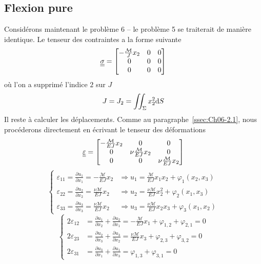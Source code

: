 \subsection{Flexion pure}
Considérons maintenant le problème 6 -- le problème 5 se traiterait de manière identique.
Le tenseur des contraintes a la forme suivante
\begin{equation}
    \underline{\underline{\sigma}} = 
    \begin{bmatrix}
        -\frac{\mathcal{M}}{J}x_2 & 0 & 0 \\
        0 & 0 & 0 \\
        0 & 0 & 0
    \end{bmatrix}
    \label{eq:Ch07-025}
\end{equation}
où l'on a supprimé l'indice $2$ sur $J$
\begin{equation}
    J=J_2 = \iint_{\Sigma} x_2^2 \mathrm{d} S
    \label{eq:Ch07-026}
\end{equation}
Il reste à calculer les déplacements.
Comme au paragraphe~\ref{ssec:Ch06-2.1}, nous procéderons directement en écrivant le tenseur des déformations
\begin{equation}
    \underline{\underline{\varepsilon}} = 
    \begin{bmatrix}
        -\frac{\mathcal{M}}{EJ}x_2 & 0 & 0 \\
        0 & \nu\frac{\mathcal{M}}{EJ}x_2 & 0 \\
        0 & 0 & \nu\frac{\mathcal{M}}{EJ}x_2
    \end{bmatrix}
    \label{eq:Ch07-027}
\end{equation}
\begin{equation}
    \left\{
    \begin{aligned}
        \varepsilon_{11} = \frac{\partial u_1}{\partial x_1} = -\frac{\mathcal{M}}{EJ}x_2 & \Rightarrow u_1 = \frac{\mathcal{M}}{EJ}x_1x_2 + \varphi_1 \left( x_2,x_3 \right) \\
        \varepsilon_{22} = \frac{\partial u_2}{\partial x_2} = \frac{\nu\mathcal{M}}{EJ}x_2 & \Rightarrow u_2 = \frac{\nu\mathcal{M}}{EJ}x_2^2 + \varphi_2 \left( x_1,x_3 \right) \\
        \varepsilon_{33} = \frac{\partial u_3}{\partial x_3} = \frac{\nu\mathcal{M}}{EJ}x_2 & \Rightarrow u_3 = \frac{\nu\mathcal{M}}{EJ}x_2x_3 + \varphi_3 \left( x_1,x_2 \right)
    \end{aligned}
    \right.
    \label{eq:Ch07-028}
\end{equation}
\begin{equation}
    \left\{
    \begin{aligned}
        2 \varepsilon_{12} &= \frac{\partial u_1}{\partial x_2} + \frac{\partial u_2}{\partial x_1} = - \frac{\mathcal{M}}{EJ}x_1 + \varphi_{1,2} + \varphi_{2,1} = 0 \\
        2 \varepsilon_{23} &= \frac{\partial u_2}{\partial x_3} + \frac{\partial u_3}{\partial x_2} = \frac{\nu\mathcal{M}}{EJ}x_3 + \varphi_{2,3} + \varphi_{3,2} = 0 \\
        2 \varepsilon_{31} &= \frac{\partial u_3}{\partial x_1} + \frac{\partial u_1}{\partial x_3} = \varphi_{1,3} + \varphi_{3,1} = 0
    \end{aligned}
    \right.
    \label{eq:Ch07-029}
\end{equation}
